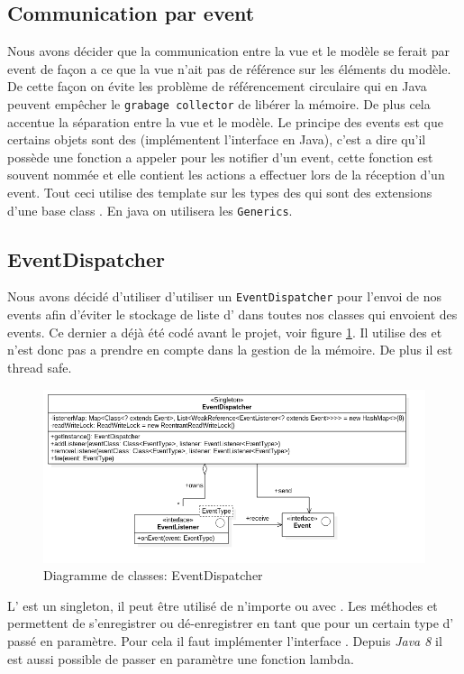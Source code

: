 \documentclass[report, backcover, french, nodocumentinfo]{upmethodology-document}
\begin{document}
			\subsection{Communication par event}
					Nous avons décider que la communication entre la vue et le modèle se ferait par event de façon a ce que la vue n'ait pas de référence sur les éléments du modèle. De cette façon on évite les problème de référencement circulaire qui en Java peuvent empêcher le \texttt{grabage collector} de libérer la mémoire. De plus cela accentue la séparation entre la vue et le modèle.
					Le principe des events est que certains objets sont des  (implémentent l'interface en Java), c'est a dire qu'il possède une fonction a appeler pour les notifier d'un event, cette fonction est souvent nommée  et elle contient les actions a effectuer lors de la réception d'un event. Tout ceci utilise des template sur les types des  qui sont des extensions d'une base class . En java on utilisera les \texttt{Generics}.
			\subsection{EventDispatcher}
				\p{}
					Nous avons décidé d'utiliser d'utiliser un \texttt{EventDispatcher} pour l'envoi de nos events afin d'éviter le stockage de liste d' dans toutes nos classes qui envoient des events. Ce dernier a déjà été codé avant le projet, voir figure \ref{fig:EventDispatcherClassDiagram}. Il utilise des  et n'est donc pas a prendre en compte dans la gestion de la mémoire. De plus il est thread safe.
					\begin{figure}[h!]
						\centering
						\includegraphics[width=\textwidth]{figures/EventDispatcherClassDiagram}
						\caption{Diagramme de classes: EventDispatcher}
						\label{fig:EventDispatcherClassDiagram}
					\end{figure}
					L' est un singleton, il peut être utilisé de n'importe ou avec . Les méthodes  et  permettent de s'enregistrer ou dé-enregistrer en tant que  pour un certain type d' passé en paramètre. Pour cela il faut implémenter l'interface . Depuis \textit{Java 8} il est aussi possible de passer en paramètre une fonction lambda.
\end{document}
